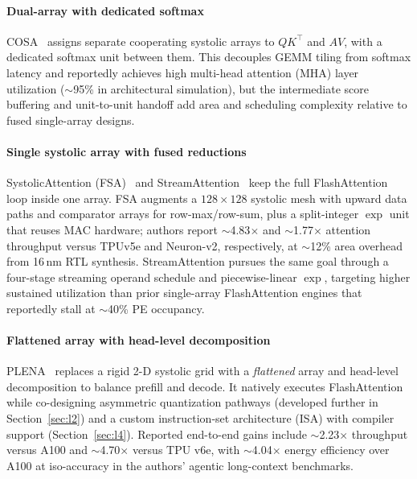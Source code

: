 \documentclass[conference]{IEEEtran}
\begin{document}
\paragraph{Dual-array with dedicated softmax}
COSA~\cite{wang2023cosa} assigns separate cooperating systolic arrays to $QK^\top$ and $AV$, with a dedicated softmax unit between them.
This decouples GEMM tiling from softmax latency and reportedly achieves high multi-head attention (MHA) layer utilization ($\sim$95\% in architectural simulation), but the intermediate score buffering and unit-to-unit handoff add area and scheduling complexity relative to fused single-array designs.

\paragraph{Single systolic array with fused reductions}
SystolicAttention (FSA)~\cite{lin2025systolicattention} and StreamAttention~\cite{streamattention2025} keep the full FlashAttention loop inside one array.
FSA augments a $128 \times 128$ systolic mesh with upward data paths and comparator arrays for row-max/row-sum, plus a split-integer $\exp$ unit that reuses MAC hardware; authors report $\sim$4.83$\times$ and $\sim$1.77$\times$ attention throughput versus TPUv5e and Neuron-v2, respectively, at $\sim$12\% area overhead from 16\,nm RTL synthesis.
StreamAttention pursues the same goal through a four-stage streaming operand schedule and piecewise-linear $\exp$, targeting higher sustained utilization than prior single-array FlashAttention engines that reportedly stall at $\sim$40\% PE occupancy.

\paragraph{Flattened array with head-level decomposition}
PLENA~\cite{plena2025} replaces a rigid 2-D systolic grid with a \emph{flattened} array and head-level decomposition to balance prefill and decode.
It natively executes FlashAttention while co-designing asymmetric quantization pathways (developed further in Section~\ref{sec:l2}) and a custom instruction-set architecture (ISA) with compiler support (Section~\ref{sec:l4}).
Reported end-to-end gains include $\sim$2.23$\times$ throughput versus A100 and $\sim$4.70$\times$ versus TPU v6e, with $\sim$4.04$\times$ energy efficiency over A100 at iso-accuracy in the authors' agentic long-context benchmarks.
\end{document}
